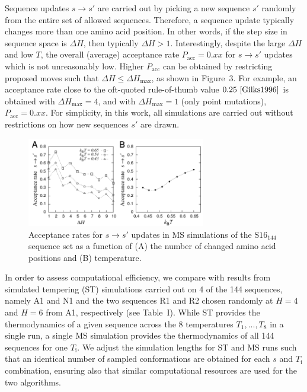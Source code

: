 \documentclass[%
 aip,
rsi,%
 amsmath,amssymb,
 reprint,%
]{revtex4-1}
\newcommand	 {\sbar}	{{s}}
\newcommand {\SR}		{${\mathrm{S16}_{144}}$}
\begin{document}
Sequence updates $\sbar\rightarrow\sbar'$ are carried out by picking a new sequence $\sbar'$ randomly from the entire set of allowed sequences. Therefore, a sequence update typically changes more than one amino acid position. In other words, if the step size in sequence space is $\Delta H$, then typically $\Delta H>1$. Interestingly, despite the large $\Delta H$ and low $T$, the overall (average) acceptance rate $P_\mathrm{acc}=0.xx$ for $\sbar\rightarrow\sbar'$ updates which is not unreasonably low. Higher $P_\mathrm{acc}$ can be obtained by restricting proposed moves such that $\Delta H\le\Delta H_\mathrm{max}$, as shown in Figure~3. For example, an acceptance rate close to the oft-quoted rule-of-thumb value $0.25~\cite{Gilks1996} $ is obtained with $\Delta H_\mathrm{max}=4$, and with $\Delta H_\mathrm{max} = 1$ (only point mutations), $P_\mathrm{acc}=0.xx$. For simplicity, in this work, all simulations are carried out without restrictions on how new sequences $\sbar'$ are drawn. 

\begin{figure}
\includegraphics[width=7.8cm]{Pacc}
\caption{Acceptance rates for $\sbar\rightarrow\sbar'$ updates in MS simulations of the {\SR} sequence set as a function of (A) the number of changed amino acid positions  and (B) temperature. }
\end{figure}

In order to assess computational efficiency, we compare with results from simulated tempering (ST) simulations carried out on 4 of the 144 sequences, namely A1 and N1 and the two sequences R1 and R2 chosen randomly at $H=4$ and $H=6$ from A1, respectively (see Table~I). While ST provides the thermodynamics of a given sequence across the 8 temperatures $T_1, ..., T_8$ in a single run, a single MS simulation provides the thermodynamics of all 144 sequences for one $T_\mathrm{i}$. We adjust the simulation lengths for ST and MS runs such that an identical number of sampled conformations are obtained for each $\sbar$ and $T_\mathrm{i}$ combination, ensuring also that similar computational resources are used for the two algorithms. 
\end{document}
